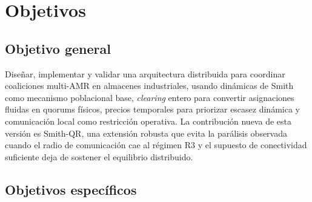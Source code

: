 \section{Objetivos}
\label{sec:objetivos}

\subsection{Objetivo general}

Diseñar, implementar y validar una arquitectura distribuida para coordinar coaliciones
multi-AMR en almacenes industriales, usando dinámicas de Smith como mecanismo
poblacional base, \emph{clearing} entero para convertir asignaciones fluidas en quorums
físicos, precios temporales para priorizar escasez dinámica y comunicación local como
restricción operativa. La contribución nueva de esta versión es Smith-QR, una extensión
robusta que evita la parálisis observada cuando el radio de comunicación cae al régimen
R3 y el supuesto de conectividad suficiente deja de sostener el equilibrio distribuido.

\subsection{Objetivos específicos}

